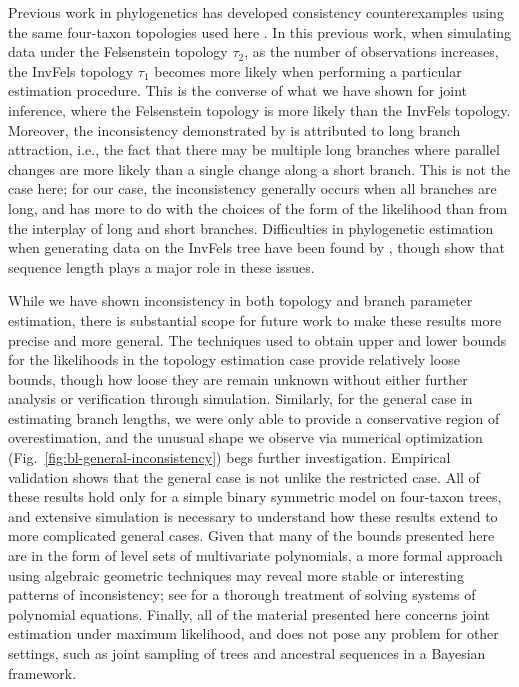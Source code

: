 \documentclass[11pt]{article}
\begin{document}
Previous work in phylogenetics has developed consistency counterexamples using the same four-taxon topologies used here \citep{Felsenstein1978-rr}.
In this previous work, when simulating data under the Felsenstein topology $\tau_2$, as the number of observations increases, the InvFels topology $\tau_1$ becomes more likely when performing a particular estimation procedure.
This is the converse of what we have shown for joint inference, where the Felsenstein topology is more likely than the InvFels topology.
Moreover, the inconsistency demonstrated by \citet{Felsenstein1978-rr} is attributed to long branch attraction, i.e., the fact that there may be multiple long branches where parallel changes are more likely than a single change along a short branch.
This is not the case here; for our case, the inconsistency generally occurs when all branches are long, and has more to do with the choices of the form of the likelihood than from the interplay of long and short branches.
Difficulties in phylogenetic estimation when generating data on the InvFels tree have been found by \citet{Siddall1998-hq}, though \citet{Swofford2001-hr} show that sequence length plays a major role in these issues.

While we have shown inconsistency in both topology and branch parameter estimation, there is substantial scope for future work to make these results more precise and more general.
The techniques used to obtain upper and lower bounds for the likelihoods in the topology estimation case provide relatively loose bounds, though how loose they are remain unknown without either further analysis or verification through simulation.
Similarly, for the general case in estimating branch lengths, we were only able to provide a conservative region of overestimation, and the unusual shape we observe via numerical optimization (Fig.~\ref{fig:bl-general-inconsistency}) begs further investigation.
Empirical validation shows that the general case is not unlike the restricted case.
All of these results hold only for a simple binary symmetric model on four-taxon trees, and extensive simulation is necessary to understand how these results extend to more complicated general cases.
Given that many of the bounds presented here are in the form of level sets of multivariate polynomials, a more formal approach using algebraic geometric techniques may reveal more stable or interesting patterns of inconsistency; see \citet{Sturmfels2002} for a thorough treatment of solving systems of polynomial equations.
Finally, all of the material presented here concerns joint estimation under maximum likelihood, and does not pose any problem for other settings, such as joint sampling of trees and ancestral sequences in a Bayesian framework.
\end{document}
